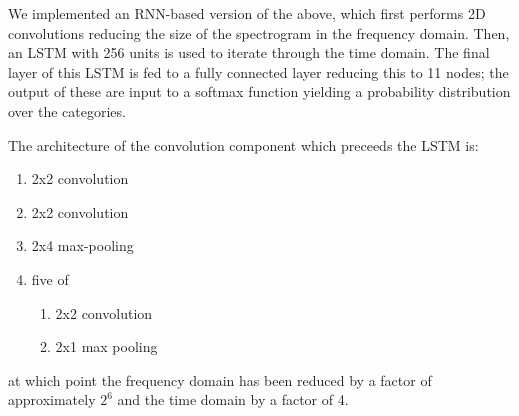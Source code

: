 We implemented an RNN-based version of the above, which first performs 2D convolutions reducing the size of the spectrogram in the frequency domain. Then, an LSTM with 256 units is used to iterate through the time domain. The final layer of this LSTM is fed to a fully connected layer reducing this to 11 nodes; the output of these are input to a softmax function yielding a probability distribution over the categories.

The architecture of the convolution component which preceeds the LSTM is:

\begin{enumerate}
\item 2x2 convolution
\item 2x2 convolution
\item 2x4 max-pooling
\item five of
\begin{enumerate}
\item 2x2 convolution
\item 2x1 max pooling
\end{enumerate}
\end{enumerate}

at which point the frequency domain has been reduced by a factor of approximately $2^6$ and the time domain by a factor of 4.